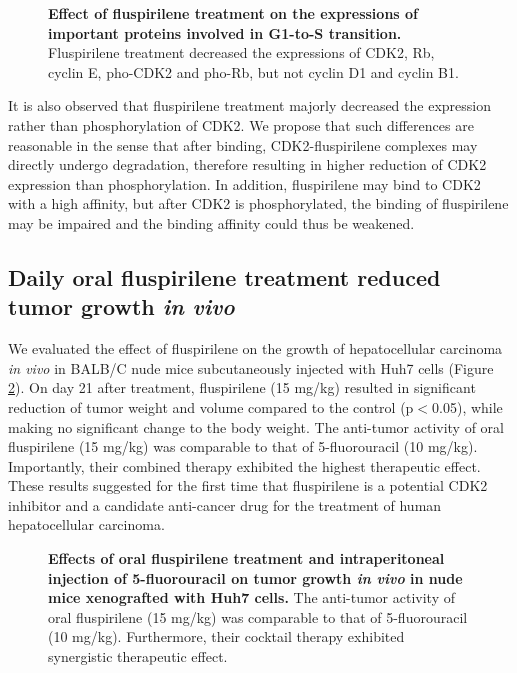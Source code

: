 \documentclass[10pt,letterpaper]{article}
\begin{document}
\begin{figure}%
\caption{{\bf Effect of fluspirilene treatment on the expressions of important proteins involved in G1-to-S transition.} Fluspirilene treatment decreased the expressions of CDK2, Rb, cyclin E, pho-CDK2 and pho-Rb, but not cyclin D1 and cyclin B1.}
\label{WesternBlot}
\end{figure}

It is also observed that fluspirilene treatment majorly decreased the expression rather than phosphorylation of CDK2. We propose that such differences are reasonable in the sense that after binding, CDK2-fluspirilene complexes may directly undergo degradation, therefore resulting in higher reduction of CDK2 expression than phosphorylation. In addition, fluspirilene may bind to CDK2 with a high affinity, but after CDK2 is phosphorylated, the binding of fluspirilene may be impaired and the binding affinity could thus be weakened.

\subsection*{Daily oral fluspirilene treatment reduced tumor growth \textit{in vivo}}

We evaluated the effect of fluspirilene on the growth of hepatocellular carcinoma \textit{in vivo} in BALB/C nude mice subcutaneously injected with Huh7 cells (Figure \ref{TumorGrowth}). On day 21 after treatment, fluspirilene (15 mg/kg) resulted in significant reduction of tumor weight and volume compared to the control (p$<$0.05), while making no significant change to the body weight. The anti-tumor activity of oral fluspirilene (15 mg/kg) was comparable to that of 5-fluorouracil (10 mg/kg). Importantly, their combined therapy exhibited the highest therapeutic effect. These results suggested for the first time that fluspirilene is a potential CDK2 inhibitor and a candidate anti-cancer drug for the treatment of human hepatocellular carcinoma.

\begin{figure}%
\caption{{\bf Effects of oral fluspirilene treatment and intraperitoneal injection of 5-fluorouracil on tumor growth \textit{in vivo} in nude mice xenografted with Huh7 cells.} The anti-tumor activity of oral fluspirilene (15 mg/kg) was comparable to that of 5-fluorouracil (10 mg/kg). Furthermore, their cocktail therapy exhibited synergistic therapeutic effect.}
\label{TumorGrowth}
\end{figure}
\end{document}

